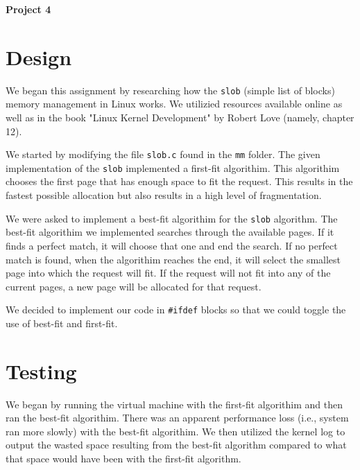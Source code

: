 \documentclass[11pt,letterpaper]{article}
\begin{document}



\begin{center} \large \textbf{Project 4} \end{center}

\section*{Design}

\par We began this assignment by researching how the \verb|slob| (simple list
of blocks) memory management in Linux works. We utilizied resources available
online as well as in the book "Linux Kernel Development" by Robert Love
(namely, chapter 12).

\par We started by modifying the file \verb|slob.c| found in the \verb|mm|
folder. The given implementation of the \verb|slob| implemented a first-fit
algorithim. This algorithim chooses the first page that has enough space to fit
the request. This results in the fastest possible allocation but also results
in a high level of fragmentation.

\par We were asked to implement a best-fit algorithim for the \verb|slob|
algorithm. The best-fit algorithim we implemented searches through the
available pages. If it finds a perfect match, it will choose that one and end
the search. If no perfect match is found, when the algorithim reaches the end,
it will select the smallest page into which the request will fit. If the
request will not fit into any of the current pages, a new page will be
allocated for that request.

\par We decided to implement our code in \verb|#ifdef| blocks so that we could
toggle the use of best-fit and first-fit.

\section*{Testing}

\par We began by running the virtual machine with the first-fit algorithim and
then ran the best-fit algorithim. There was an apparent performance loss (i.e.,
system ran more slowly) with the best-fit algorithim. We then utilized the
kernel log to output the wasted space resulting from the best-fit algorithm
compared to what that space would have been with the first-fit algorithm.
\end{document}
